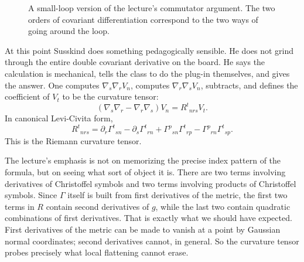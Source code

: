 \begin{figure}[h]
\centering
{}
\caption{A small-loop version of the lecture's commutator argument. The two orders of covariant differentiation correspond to the two ways of going around the loop.}
\end{figure}

At this point Susskind does something pedagogically sensible. He does not grind through the entire double covariant derivative on the board. He says the calculation is mechanical, tells the class to do the plug-in themselves, and gives the answer. One computes \(\nabla_s\nabla_r V_n\), computes \(\nabla_r\nabla_s V_n\), subtracts, and defines the coefficient of \(V_t\) to be the curvature tensor:
\begin{equation}
(\nabla_s\nabla_r-\nabla_r\nabla_s)V_n
=
R^{t}{}_{nrs}V_t.
\end{equation}
In canonical Levi-Civita form,
\begin{equation}
R^{t}{}_{nrs}
=
\partial_r\Gamma^{t}{}_{sn}
-
\partial_s\Gamma^{t}{}_{rn}
+
\Gamma^{p}{}_{sn}\Gamma^{t}{}_{rp}
-
\Gamma^{p}{}_{rn}\Gamma^{t}{}_{sp}.
\end{equation}
This is the Riemann curvature tensor.

The lecture's emphasis is not on memorizing the precise index pattern of the formula, but on seeing what sort of object it is. There are two terms involving derivatives of Christoffel symbols and two terms involving products of Christoffel symbols. Since \(\Gamma\) itself is built from first derivatives of the metric, the first two terms in \(R\) contain second derivatives of \(g\), while the last two contain quadratic combinations of first derivatives. That is exactly what we should have expected. First derivatives of the metric can be made to vanish at a point by Gaussian normal coordinates; second derivatives cannot, in general. So the curvature tensor probes precisely what local flattening cannot erase.

